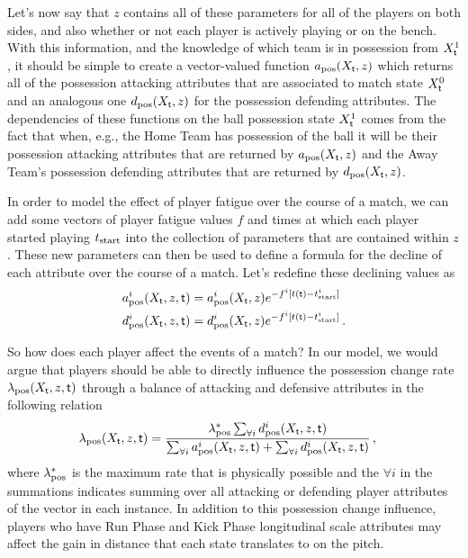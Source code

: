 Let's now say that $z$ contains all of these parameters for all of the players on both sides, and also whether or not each player is actively playing or on the bench. With this information, and the knowledge of which team is in possession from $X^1_{\sf t}$, it should be simple to create a vector-valued function $a_{\rm pos}(X_{\sf t}, z)$ which returns all of the possession attacking attributes that are associated to match state $X^0_{\sf t}$ and an analogous one $d_{\rm pos}(X_{\sf t}, z)$ for the possession defending attributes. The dependencies of these functions on the ball possession state $X^1_{\sf t}$ comes from the fact that when, e.g., the {\sf Home Team} has possession of the ball it will be their possession attacking attributes that are returned by $a_{\rm pos}(X_{\sf t}, z)$ and the {\sf Away Team}'s possession defending attributes that are returned by $d_{\rm pos}(X_{\sf t}, z)$.

In order to model the effect of player fatigue over the course of a match, we can add some vectors of player fatigue values $f$ and times at which each player started playing $t_{\rm start}$ into the collection of parameters that are contained within $z$. These new parameters can then be used to define a formula for the decline of each attribute over the course of a match. Let's redefine these declining values as
\begin{align}
a^i_{\rm pos}(X_{\sf t}, z, {\sf t}) &= a^i_{\rm pos}(X_{\sf t}, z)e^{-f^i[t({\sf t})-t^i_{\rm start}]} \label{eq:att-player-fatigue} \\
d^i_{\rm pos}(X_{\sf t}, z, {\sf t}) &= d^i_{\rm pos}(X_{\sf t}, z)e^{-f^i[t({\sf t})-t^i_{\rm start}]} \label{eq:def-player-fatigue} \,.
\end{align}

So how does each player affect the events of a match? In our model, we would argue that players should be able to directly influence the possession change rate $\lambda_{\rm pos}(X_{\sf t}, z, {\sf t})$ through a balance of attacking and defensive attributes in the following relation
\begin{align}
\lambda_{\rm pos}(X_{\sf t}, z, {\sf t}) &= \frac{\lambda^*_{\rm pos}\sum_{\forall i}d^i_{\rm pos}(X_{\sf t}, z, {\sf t})}{\sum_{\forall i}a^i_{\rm pos}(X_{\sf t}, z, {\sf t}) + \sum_{\forall i}d^i_{\rm pos}(X_{\sf t}, z, {\sf t})}\,,
\end{align}
where $\lambda^*_{\rm pos}$ is the maximum rate that is physically possible and the $\forall i$ in the summations indicates summing over all attacking or defending player attributes of the vector in each instance. In addition to this possession change influence, players who have {\sf Run Phase} and {\sf Kick Phase} longitudinal scale attributes may affect the gain in distance that each state translates to on the pitch. 

